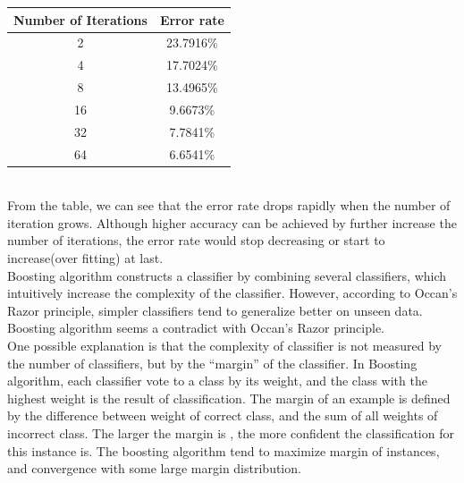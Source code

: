 \documentclass[a4paper,11pt]{article}
\begin{document}
\vspace{0.5cm}
\begin{tabular}{c c}
Number of Iterations	& Error rate\\
\hline \hline
	2		& 23.7916\%\\
	4		& 17.7024\%\\
	8		& 13.4965\%\\
	16		& 9.6673\%\\
    32      & 7.7841\%\\
    64      & 6.6541\%\\
\end{tabular}
\vspace{0.5cm}\\
From the table, we can see that the error rate drops rapidly when the number of iteration grows. Although higher accuracy can be achieved by further increase the number of iterations, the error rate would stop decreasing or start to increase(over fitting) at last.\\
Boosting algorithm constructs a classifier by combining several classifiers, which intuitively increase the complexity of the classifier. However, according to Occan's Razor principle, simpler classifiers tend to generalize better on unseen data. Boosting algorithm seems a contradict with Occan's Razor principle.\\
One possible explanation is that the complexity of classifier is not measured by the number of classifiers, but by the ``margin'' of the classifier.
In Boosting algorithm, each classifier vote to a class by its weight, and the class with the highest weight is the result of classification. The margin of an example is defined by the difference between weight of correct class, and the sum of all weights of incorrect class. The larger the margin is , the more confident the classification for this instance is. The boosting algorithm tend to maximize margin of instances, and convergence with some large margin distribution\cite{boosting}.
\end{document}
